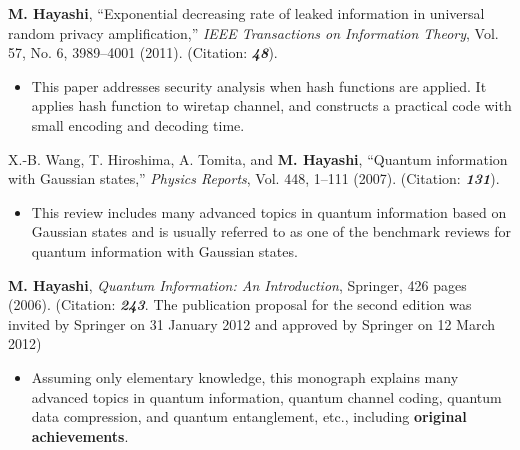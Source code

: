 \begin{thebibliography}{99}
 \textbf{M. Hayashi}, 
``Exponential decreasing rate of leaked information in universal random privacy amplification,''
{\em IEEE Transactions on Information Theory}, 
Vol. 57, No. 6, 3989--4001 (2011).
(Citation: \textbf{\textit{48}}).

\begin{itemize}
\item This paper addresses security analysis when hash functions are applied.
It applies hash function to wiretap channel,
and constructs a practical code with small encoding and decoding time.
 
\end{itemize}
\vspace{3 mm}


X.-B. Wang, T. Hiroshima, A. Tomita, and \textbf{M. Hayashi}, 
``Quantum information with Gaussian states,'' 
{\em Physics Reports}, Vol. 448, 1--111 (2007). 
(Citation: \textbf{\textit{131}}).

\begin{itemize}

\item This review includes many advanced topics in quantum information based on Gaussian states and is usually referred to
as one of the benchmark reviews for quantum information with Gaussian states.

\end{itemize}
\vspace{3 mm}


 \textbf{M. Hayashi}, 
{\em Quantum Information: An Introduction}, 
Springer, 426 pages (2006).
(Citation: \textbf{\textit{243}}.
The publication proposal for the second edition was 
invited by Springer on 31 January 2012
and approved by Springer on 12 March 2012)

\begin{itemize}
\item 
Assuming only elementary knowledge,
this monograph explains many advanced topics 
in quantum information, 
quantum channel coding, quantum data compression, and quantum entanglement, etc.,
including \textbf{original achievements}.


\end{itemize}
\end{thebibliography}
